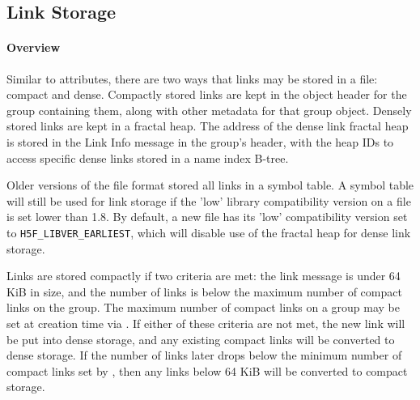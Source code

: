 \subsection{Link Storage}

\paragraph{Overview}  Similar to attributes, there are two ways that links may be stored in a file: compact and dense. Compactly stored links are kept in the object header for the group containing them, along with other metadata for that group object. Densely stored links are kept in a fractal heap. The address of the dense link fractal heap is stored in the Link Info message in the group's header, with the heap IDs to access specific dense links stored in a name index B-tree.

Older versions of the file format stored all links in a symbol table. A symbol table will still be used for link storage if the 'low' library compatibility version on a file is set lower than 1.8. By default, a new file has its 'low' compatibility version set to \texttt{H5F\_LIBVER\_EARLIEST}, which will disable use of the fractal heap for dense link storage.

Links are stored compactly if two criteria are met: the link message is under 64 KiB in size, and the number of links is below the maximum number of compact links on the group. The maximum number of compact links on a group may be set at creation time via . If either of these criteria are not met, the new link will be put into dense storage, and any existing compact links will be converted to dense storage. If the number of links later drops below the minimum number of compact links set by , then any links below 64 KiB will be converted to compact storage.

